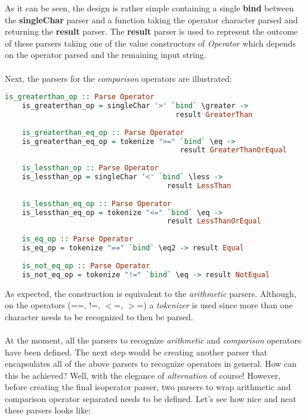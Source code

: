 \documentclass[a4paper, onecolumn]{article}
\begin{document}
    \noindent As it can be seen, the design is rather simple containing a single \textbf{bind} between the \textbf{singleChar} parser and a function taking the operator character parsed and returning the \textbf{result} parser. The \textbf{result} parser is used to represent the outcome of these parsers taking one of the value constructors of \textit{Operator} which depends on the operator parsed and the remaining input string. \\ \\ 
    Next, the parsers for the \textit{comparison} operators are illustrated:
    
    \begin{tcolorbox}
    \begin{lstlisting}[language=Haskell] 
    is_greaterthan_op :: Parse Operator 
    is_greaterthan_op = singleChar '>' `bind` \greater -> 
                                        result GreaterThan
    
    is_greaterthan_eq_op :: Parse Operator 
    is_greaterthan_eq_op = tokenize ">=" `bind` \eq -> 
                                         result GreaterThanOrEqual
    
    is_lessthan_op :: Parse Operator 
    is_lessthan_op = singleChar '<' `bind` \less ->
                                      result LessThan
    
    is_lessthan_eq_op :: Parse Operator 
    is_lessthan_eq_op = tokenize "<=" `bind` \eq -> 
                                      result LessThanOrEqual
    
    is_eq_op :: Parse Operator
    is_eq_op = tokenize "==" `bind` \eq2 -> result Equal
    
    is_not_eq_op :: Parse Operator
    is_not_eq_op = tokenize "!=" `bind` \eq -> result NotEqual
    \end{lstlisting}
    \end{tcolorbox}
    
    \noindent As expected, the construction is equivalent to the \textit{arithmetic} parsers. Although, on the operators (==, !=, $<$=, $>$=) a \textit{tokenizer} is used since more than one character needs to be recognized to then be parsed. \\ \\
    At the moment, all the parsers to recognize \textit{arithmetic} and \textit{comparison} operators have been defined. The next step would be creating another parser that encapsulates all of the above parsers to recognize operators in general. How can this be achieved? Well, with the elegance of \textit{alternation} of course! However, before creating the final is\textunderscore operator parser, two parsers to wrap arithmetic and comparison operator separated needs to be defined. Let's see how nice and neat these parsers looks like:
    
\end{document}
